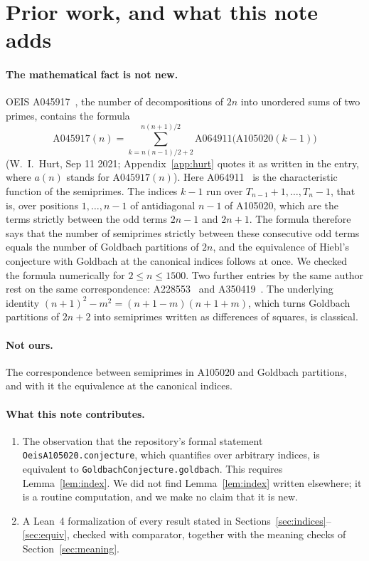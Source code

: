 \documentclass[11pt,a4paper]{article}
\newcommand{\li}{\lstinline[style=inline]}
\theoremstyle{plain}
\theoremstyle{remark}
\begin{document}
{\section{Prior work, and what this note adds}\label{sec:prior}

\paragraph{The mathematical fact is not new.}
OEIS A045917~\cite{oeis-a045917}, the number of decompositions of $2n$ into unordered
sums of two primes, contains the formula
\[
  \mathrm{A045917}(n) = \sum_{k = n(n-1)/2 + 2}^{n(n+1)/2}
    \mathrm{A064911}\bigl(\mathrm{A105020}(k-1)\bigr)
\]
(W.~I.~Hurt, Sep 11 2021; Appendix~\ref{app:hurt} quotes it as written in the entry,
where $a(n)$ stands for $\mathrm{A045917}(n)$). Here A064911~\cite{oeis-a064911} is the
characteristic function of the semiprimes. The indices $k-1$ run over
$T_{n-1}+1, \dots, T_n - 1$, that is, over positions $1, \dots, n-1$ of antidiagonal
$n-1$ of A105020, which are the terms strictly between the odd terms $2n-1$ and $2n+1$.
The formula therefore says that the number of semiprimes strictly between these
consecutive odd terms equals the number of Goldbach partitions of $2n$, and the
equivalence of Hiebl's conjecture with Goldbach at the canonical indices follows at
once. We checked the formula numerically for $2 \le n \le 1500$. Two further entries by
the same author rest on the same correspondence: A228553~\cite{oeis-a228553} and
A350419~\cite{oeis-a350419}. The underlying identity
$(n+1)^2 - m^2 = (n+1-m)(n+1+m)$, which turns Goldbach partitions of $2n+2$ into
semiprimes written as differences of squares, is classical.

\paragraph{Not ours.}
The correspondence between semiprimes in A105020 and Goldbach partitions, and with it
the equivalence at the canonical indices.

\paragraph{What this note contributes.}
\begin{enumerate}
\item The observation that the repository's formal statement
  \li{OeisA105020.conjecture}, which quantifies over arbitrary indices, is equivalent
  to \li{GoldbachConjecture.goldbach}. This requires Lemma~\ref{lem:index}. We did
  not find Lemma~\ref{lem:index} written elsewhere; it is a routine computation, and we
  make no claim that it is new.
\item A Lean~4 formalization of every result stated in
  Sections~\ref{sec:indices}--\ref{sec:equiv}, checked with comparator, together with
  the meaning checks of Section~\ref{sec:meaning}.
\end{enumerate}

}
\end{document}
